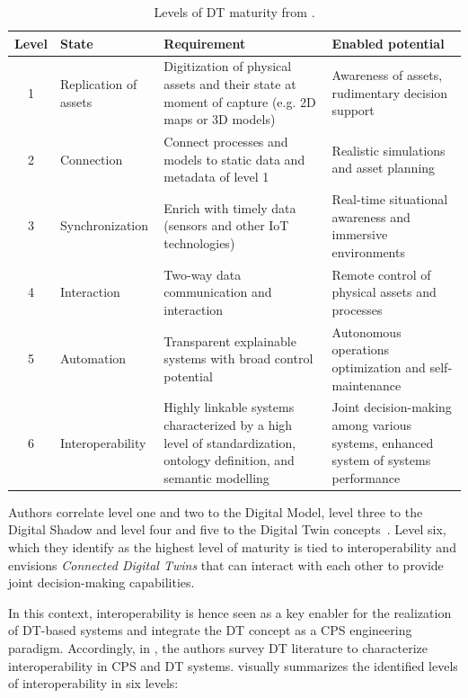 \begin{table}[htbp]
\centering
\renewcommand{\arraystretch}{1.2}
\begin{tabular}{c|p{2.8cm}|p{5cm}|p{4cm}}
\toprule
\midrule
\textbf{Level} & \textbf{State} & \textbf{Requirement} & \textbf{Enabled potential} \\
\midrule
\toprule
1 & Replication of assets & 
Digitization of physical assets and their state at moment of capture (e.g. 2D maps or 3D models) & 
Awareness of assets, rudimentary decision support \\
\hline
2 & Connection & 
Connect processes and models to static data and metadata of level 1 & 
Realistic simulations and asset planning \\
\hline
3 & Synchronization & 
Enrich with timely data (sensors and other IoT technologies) & 
Real-time situational awareness and immersive environments \\
\hline
4 & Interaction & 
Two-way data communication and interaction & 
Remote control of physical assets and processes \\
\hline
5 & Automation & 
Transparent explainable systems with broad control potential & 
Autonomous operations optimization and self-maintenance \\
\hline
6 & Interoperability & 
Highly linkable systems characterized by a high level of standardization, ontology definition, and semantic modelling & 
Joint decision-making among various systems, enhanced system of systems performance \\
\midrule
\bottomrule
\end{tabular}
\caption{Levels of \acl{DT} maturity from \cite{Klar_Arvidsson_Angelakis_2024}.}
\label{tab:dt-maturity}
\end{table}

Authors correlate level one and two to the Digital Model, level three to the Digital Shadow and level four and five to the Digital Twin concepts~\cite{kritzinger2018dtmanufacturing}.
%
Level six, which they identify as the highest level of maturity is tied to interoperability and envisions \emph{Connected Digital Twins} that can interact with each other to provide joint decision-making capabilities. 

In this context, interoperability is hence seen as a key enabler for the realization of \ac{DT}-based systems and integrate the \ac{DT} concept as a \ac{CPS} engineering paradigm. 
%
Accordingly, in \cite{Acharya_Khan_Päivärinta_2024}, the authors survey \ac{DT} literature to characterize interoperability in \ac{CPS} and \ac{DT} systems.
%
 visually summarizes the identified levels of interoperability in six levels: 

